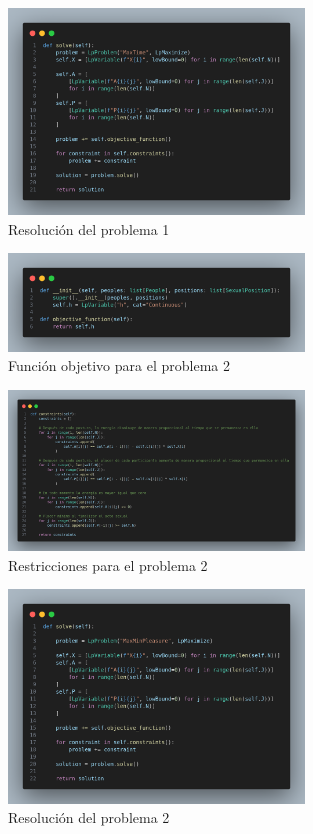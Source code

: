\documentclass[12pt]{article}
\begin{document}
\begin{figure}
    \centering
    \includegraphics[width=0.7\textwidth]{images/max_solve.png}
    \caption{Resolución del problema 1}
    \label{fig:rs1}
\end{figure}

\begin{figure}
    \centering
    \includegraphics[width=0.7\textwidth]{images/max_min_objetive.png}
    \caption{Función objetivo para el problema 2}
    \label{fig:fop2}
\end{figure}

\begin{figure}
    \centering
    \includegraphics[width=0.7\textwidth]{images/max_min_constraints.png}
    \caption{Restricciones para el problema 2}
    \label{fig:rp2}
\end{figure}

\begin{figure}
    \centering
    \includegraphics[width=0.7\textwidth]{images/max_min_solve.png}
    \caption{Resolución del problema 2}
    \label{fig:rs2} 
\end{figure}
\end{document}
